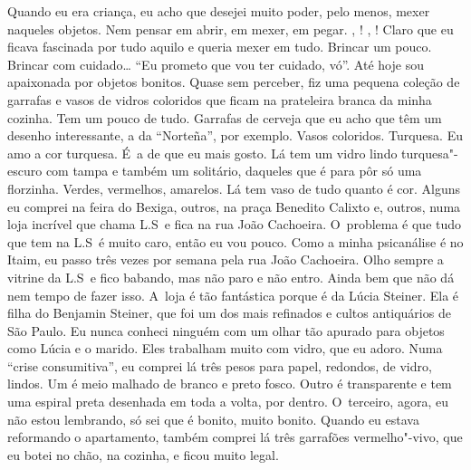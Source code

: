 Quando eu era criança, eu acho que desejei muito poder, pelo menos,
mexer naqueles objetos. Nem pensar em abrir, em mexer, em pegar. 
, ! , ! Claro que eu ficava fascinada por tudo aquilo
e queria mexer em tudo. Brincar um pouco. Brincar com cuidado…
``Eu prometo que vou ter cuidado, vó''. Até hoje sou apaixonada por
objetos bonitos. Quase sem perceber, fiz uma pequena coleção de garrafas
e vasos de vidros coloridos que ficam na prateleira branca da minha
cozinha. Tem um pouco de tudo. Garrafas de cerveja que eu acho que têm
um desenho interessante, a da ``Norteña'', por exemplo. Vasos coloridos.
Turquesa. Eu amo a cor turquesa. É~a de que eu mais gosto. Lá tem um
vidro lindo turquesa"-escuro com tampa e também um solitário, daqueles
que é para pôr só uma florzinha. Verdes, vermelhos, amarelos. Lá tem
vaso de tudo quanto é cor. Alguns eu comprei na feira do Bexiga, outros,
na praça Benedito Calixto e, outros, numa loja incrível que chama L.S\, e
fica na rua João Cachoeira. O~problema é que tudo que tem na L.S\, é
muito caro, então eu vou pouco. Como a minha psicanálise é no Itaim, eu
passo três vezes por semana pela rua João Cachoeira. Olho sempre a
vitrine da L.S\, e fico babando, mas não paro e não entro. Ainda bem que
não dá nem tempo de fazer isso. A~loja é tão fantástica porque é da
Lúcia Steiner. Ela é filha do Benjamin Steiner, que foi um dos mais
refinados e cultos antiquários de São Paulo. Eu nunca conheci ninguém
com um olhar tão apurado para objetos como Lúcia e o marido. Eles
trabalham muito com vidro, que eu adoro. Numa ``crise consumitiva'', eu
comprei lá três pesos para papel, redondos, de vidro, lindos. Um é meio
malhado de branco e preto fosco. Outro é transparente e tem uma espiral
preta desenhada em toda a volta, por dentro. O~terceiro, agora, eu não
estou lembrando, só sei que é bonito, muito bonito. Quando eu estava
reformando o apartamento, também comprei lá três garrafões
vermelho"-vivo, que eu botei no chão, na cozinha, e ficou muito legal.

